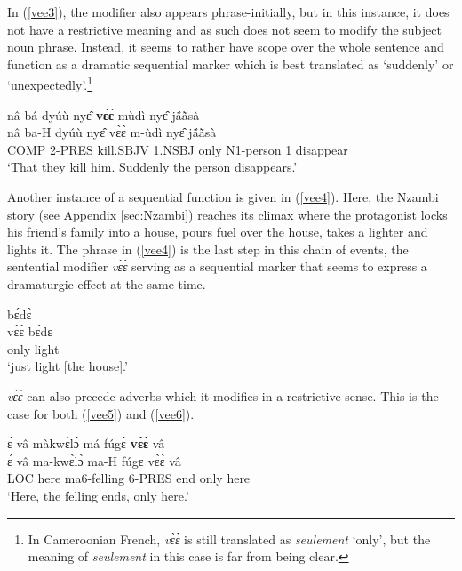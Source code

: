 In (\ref{vee3}), the modifier also appears phrase-initially, but in this instance, it does not have a restrictive meaning and as such does not seem to modify the subject noun phrase. Instead, it seems to rather have scope over the whole sentence and function as a dramatic sequential marker which is best translated as `suddenly' or `unexpectedly'.\footnote{In Cameroonian French, {\itshape vɛ̀ɛ̀} is still translated as {\itshape seulement} `only', but the meaning of {\itshape seulement} in this case is far from being clear.}

\begin{exe} 
\ex\label{vee3}
  \glll   nâ bá dyúù nyɛ̂ {\bfseries vɛ̀ɛ̀} mùdì nyɛ̂ jã́ã̀sà \\
           nâ ba-H dyúù nyɛ̂ vɛ̀ɛ̀ m-ùdì nyɛ̂ jã́ã̀sà      \\
         COMP 2-PRES kill.SBJV 1.NSBJ only N1-person 1 disappear \\
    \trans `That they kill him. Suddenly the person disappears.'
\end{exe}

Another instance of a sequential function is given in (\ref{vee4}). Here, the Nzambi story (see Appendix \ref{sec:Nzambi}) reaches its climax where the protagonist locks his friend's family into a house, pours fuel over the house, takes a lighter and lights it. The phrase in (\ref{vee4}) is the last step in this chain of events, the sentential modifier {\itshape vɛ̀ɛ̀} serving as a sequential marker that seems to express a dramaturgic effect at the same time.

\begin{exe} 
\ex\label{vee4}
   bɛ́dɛ̀ \\
       vɛ̀ɛ̀ bɛ́dɛ \\
       only light  \\
    \trans `just light [the house].'
\end{exe}


{\itshape vɛ̀ɛ̀} can also precede adverbs which it modifies in a restrictive sense. This is the case for both (\ref{vee5}) and (\ref{vee6}).


\begin{exe} 
\ex\label{vee5}
  \glll ɛ́ vâ màkwɛ̀lɔ̀ má fúgɛ̀ {\bfseries vɛ̀ɛ̀} vâ \\
         ɛ́ vâ ma-kwɛ̀lɔ̀ ma-H fúgɛ vɛ̀ɛ̀ vâ \\
         LOC here ma6-felling 6-PRES end only here \\
    \trans `Here, the felling ends, only here.'
\end{exe}

